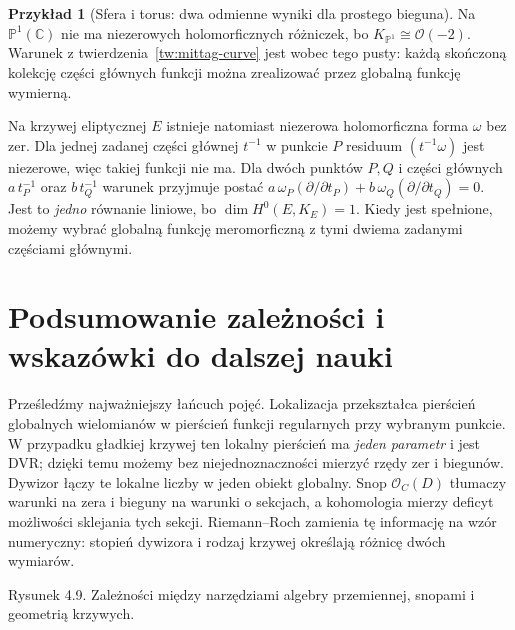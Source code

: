 \documentclass[11pt,a4paper,openany]{report}
\numberwithin{equation}{section}
\theoremstyle{plain}
\theoremstyle{definition}
\newtheorem{przyklad}[twierdzenie]{Przykład}
\theoremstyle{remark}
\newcommand{\C}{\mathbb C}
\newcommand{\PP}{\mathbb P}
\begin{document}
\begin{przyklad}[Sfera i torus: dwa odmienne wyniki dla prostego bieguna]
Na $\PP^1(\C)$ nie ma niezerowych holomorficznych
różniczek, bo $K_{\PP^1}\cong\mathcal O(-2)$.
Warunek z twierdzenia~\ref{tw:mittag-curve}
jest wobec tego pusty: każdą skończoną kolekcję
części głównych funkcji można zrealizować
przez globalną funkcję wymierną.

Na krzywej eliptycznej $E$ istnieje natomiast
niezerowa holomorficzna forma $\omega$ bez zer.
Dla jednej zadanej części głównej $t^{-1}$ w punkcie
$P$ residuum $(t^{-1}\omega)$ jest niezerowe,
więc takiej funkcji nie ma. Dla dwóch punktów
$P,Q$ i części głównych
$a\,t_P^{-1}$ oraz $b\,t_Q^{-1}$
warunek przyjmuje postać
$a\,\omega_P(\partial/\partial t_P)
+b\,\omega_Q(\partial/\partial t_Q)=0$.
Jest to \emph{jedno} równanie liniowe, bo
$\dim H^0(E,K_E)=1$. Kiedy jest spełnione,
możemy wybrać globalną funkcję meromorficzną
z tymi dwiema zadanymi częściami głównymi.
\end{przyklad}

\section{Podsumowanie zależności i wskazówki do dalszej nauki}
\label{sec:summary-four}

Prześledźmy najważniejszy łańcuch pojęć. Lokalizacja
przekształca pierścień globalnych wielomianów
w pierścień funkcji regularnych przy wybranym
punkcie. W przypadku gładkiej krzywej ten lokalny
pierścień ma \emph{jeden parametr} i jest DVR;
dzięki temu możemy bez niejednoznaczności mierzyć
rzędy zer i biegunów. Dywizor łączy te lokalne
liczby w jeden obiekt globalny. Snop
$\mathcal O_C(D)$ tłumaczy warunki na zera i bieguny
na warunki o sekcjach, a kohomologia mierzy
deficyt możliwości sklejania tych sekcji.
Riemann--Roch zamienia tę informację na wzór
numeryczny: stopień dywizora i rodzaj krzywej
określają różnicę dwóch wymiarów.

\begin{center}

{\small Rysunek 4.9. Zależności między narzędziami algebry przemiennej, snopami i geometrią krzywych.}\par
\end{center}
\end{document}
